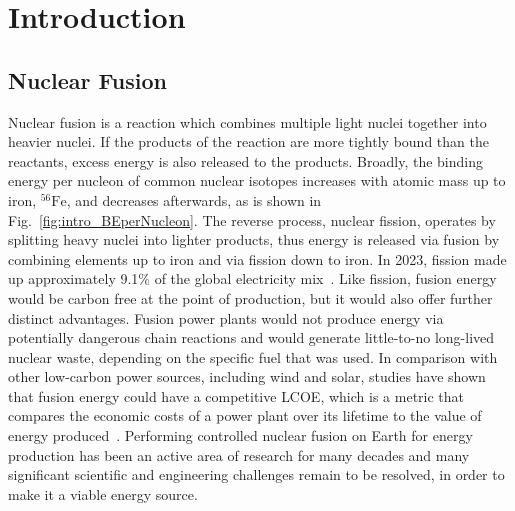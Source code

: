 \chapter{Introduction} \label{chap:intro}


\section{Nuclear Fusion}%
\label{sec:intro_whatisfusion}

Nuclear fusion is a reaction which combines multiple light nuclei together into heavier nuclei.
If the products of the reaction are more tightly bound than the reactants, excess energy is also released to the products.
Broadly, the binding energy per nucleon of common nuclear isotopes increases with atomic mass up to iron, ${}^{56}\text{Fe}$, and decreases afterwards, as is shown in Fig.~\ref{fig:intro_BEperNucleon}.
The reverse process, nuclear fission, operates by splitting heavy nuclei into lighter products, thus energy is released via fusion by combining elements up to iron and via fission down to iron.
In 2023, fission made up approximately 9.1\% of the global electricity mix~\cite{emberinstitute_statistical_2024}.
Like fission, fusion energy would be carbon free at the point of production, but it would also offer further distinct advantages.
Fusion power plants would not produce energy via potentially dangerous chain reactions and would generate little-to-no long-lived nuclear waste, depending on the specific fuel that was used.
In comparison with other low-carbon power sources, including wind and solar, studies have shown that fusion energy could have a competitive \ac{LCOE}, which is a metric that compares the economic costs of a power plant over its lifetime to the value of energy produced~\cite{griffiths_commercialisation_2022}.
Performing controlled nuclear fusion on Earth for energy production has been an active area of research for many decades and many significant scientific and engineering challenges remain to be resolved, in order to make it a viable energy source.

